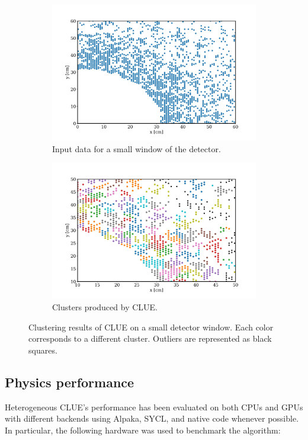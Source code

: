 \begin{figure}[H]
    \centering
    \begin{subfigure}[t]{0.49\textwidth}
    \includegraphics[width=\textwidth]{media/detector_window.jpg}
    \caption{Input data for a small window of the detector.}
    \end{subfigure}
    \begin{subfigure}[t]{0.49\textwidth}
    \includegraphics[width=\textwidth]{media/detector_window_clusters.jpg}
    \caption{Clusters produced by CLUE.}
    \end{subfigure}
    \caption{Clustering results of CLUE on a small detector window. Each color corresponds to a different cluster. Outliers are represented as black squares.}
    \label{fig:clustering_window}
\end{figure}

\subsection{Physics performance}
Heterogeneous CLUE's performance has been evaluated on both CPUs and GPUs with different backends using Alpaka, SYCL, and native code whenever possible. In particular, the following hardware was used to benchmark the algorithm:


